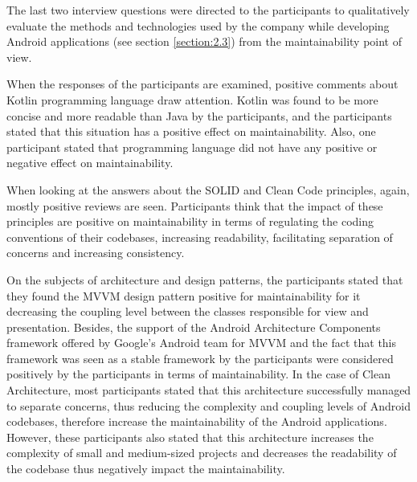 The last two interview questions were directed to the participants to qualitatively evaluate the methods and technologies used by the company while developing Android applications  (see section \ref{section:2.3}) from the maintainability point  of view. 

When the responses of the participants are examined, positive comments about Kotlin programming language draw attention. Kotlin was found to be more concise and more readable than Java by the participants, and the participants stated that this situation has a positive effect on maintainability. Also, one participant stated that programming language did not have any positive or negative effect on maintainability. 

When looking at the answers about the SOLID and Clean Code principles, again, mostly positive reviews are seen. Participants think that the impact of these principles are positive on maintainability in terms of regulating the coding conventions of their codebases, increasing readability, facilitating separation of concerns and increasing consistency. 

On the subjects of architecture and design patterns, the participants stated that they found the MVVM design pattern positive for maintainability for it decreasing the coupling level between the classes responsible for view and presentation. Besides, the support of the Android Architecture Components framework offered by Google's Android team for MVVM and the fact that this framework was seen as a stable framework by the participants were considered positively by the participants in terms of maintainability. In the case of Clean Architecture, most participants stated that this architecture successfully managed to separate concerns, thus reducing the complexity and coupling levels of Android codebases, therefore increase the maintainability of the Android applications. However, these participants also stated that this architecture increases the complexity of small and medium-sized projects and decreases the readability of the codebase thus negatively impact the maintainability. 

